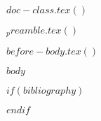 $doc-class.tex()$

$_preamble.tex()$



$before-body.tex()$

$body$

%
%
$if(bibliography)$

$endif$


